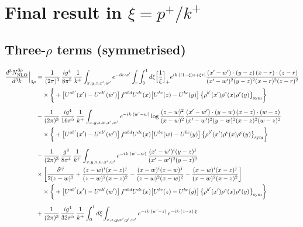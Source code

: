 \documentclass[10pt]{article}
\numberwithin{equation}{section}
\begin{document}
\section{Final result in $\xi=p^{+}/k^{+}$}
\subsection{Three-$\rho$ terms (symmetrised)}
\begin{align}
\frac{d^{3}N^{3\rho}_{\rm NLO}}{d^{3}k}\Big|_{3\rho}&=\frac{1}{(2\pi)^{3}}\,\frac{ig^{4}}{8\pi^{5}}\,\frac{1}{k^{+}}\int_{x,y,z,x^{\prime},w^{\prime}}e^{-ik\cdot w^{\prime}}\int_{r}\int_{0}^{1}d\xi\Big[\frac1\xi\Big]_{+}e^{ik\cdot[(1-\xi)z+\xi r]}\frac{(x^{\prime}-w^{\prime})\cdot(y-z)\,(x-r)\cdot(z-r)}{(x^{\prime}-w^{\prime})^{2}(y-z)^{2}(x-r)^{2}(z-r)^{2}}\notag\\
&\quad\times\bigg\{+\big[U^{ab^{\prime}}(x^{\prime})-U^{ab^{\prime}}(w^{\prime})\big]\,f^{abd}U^{de}(x)\big[U^{bc}(z)-U^{bc}(y)\big]\,\big\{\rho^{b^{\prime}}(x^{\prime})\rho^{e}(x)\rho^{c}(y)\big\}_{\rm sym}\bigg\}\notag\\[6pt]
&-\frac{1}{(2\pi)^{3}}\,\frac{ig^{4}}{16\pi^{5}}\,\frac{1}{k^{+}}\int_{x,y,z,w,x^{\prime},w^{\prime}}e^{-ik\cdot(w^{\prime}-w)}\log\frac{(z-w)^{2}}{(x-w)^{2}}\frac{(x^{\prime}-w^{\prime})\cdot(y-w)\,(x-z)\cdot(w-z)}{(x^{\prime}-w^{\prime})^{2}(y-w)^{2}(x-z)^{2}(w-z)^{2}}\notag\\
&\quad\times\bigg\{+\big[U^{ab^{\prime}}(x^{\prime})-U^{ab^{\prime}}(w^{\prime})\big]\,f^{abd}U^{de}(x)\big[U^{bc}(w)-U^{bc}(y)\big]\,\big\{\rho^{b^{\prime}}(x^{\prime})\rho^{e}(x)\rho^{c}(y)\big\}_{\rm sym}\bigg\}\notag\\[6pt]
&-\frac{1}{(2\pi)^{3}}\,\frac{g^{4}}{8\pi^{4}}\,\frac{1}{k^{+}}\int_{x,y,z,w,x^{\prime},w^{\prime}}e^{-ik\cdot(w^{\prime}-w)}\,\frac{(x^{\prime}-w^{\prime})^{i}(y-z)^{j}}{(x^{\prime}-w^{\prime})^{2}(y-z)^{2}}\notag\\
&\times\bigg[\frac{\delta^{ij}}{2(z-w)^{2}}+\frac{(z-w)^{i}(x-z)^{j}}{(z-w)^{2}(x-z)^{2}}-\frac{(x-w)^{i}(z-w)^{j}}{(z-w)^{2}(x-w)^{2}}-\frac{(x-w)^{i}(x-z)^{j}}{(x-w)^{2}(x-z)^{2}}\bigg]\notag\\
&\quad\times\bigg\{+\big[U^{ab^{\prime}}(x^{\prime})-U^{ab^{\prime}}(w^{\prime})\big]\,f^{abd}U^{de}(x)\big[U^{bc}(z)-U^{bc}(y)\big]\,\big\{\rho^{b^{\prime}}(x^{\prime})\rho^{e}(x)\rho^{c}(y)\big\}_{\rm sym}\bigg\}\notag\\[6pt]
&+\frac{1}{(2\pi)^{3}}\,\frac{ig^{4}}{32\pi^{5}}\,\frac{1}{k^{+}}\int_{0}^{1}d\xi\int_{x,z,y,x^{\prime},y^{\prime},w^{\prime}}e^{-ik\cdot(w^{\prime}-z)}\,e^{-ik\cdot(z-x)\,\xi}\notag\\

\end{align}
\end{document}
